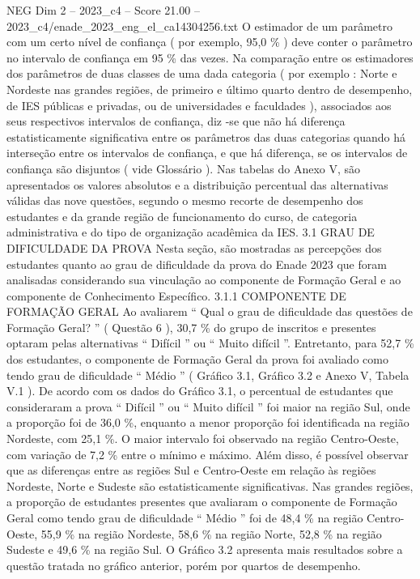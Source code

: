 \begin{textsample}{NEG Dim 2 – 2023\_c4 – Score 21.00 – 2023\_c4/enade\_2023\_eng\_el\_ca14304256.txt}
O estimador de um parâmetro com um certo nível de confiança ( por exemplo, 95,0 \% ) deve conter o parâmetro no intervalo de confiança em 95 \% das vezes.
Na comparação entre os estimadores dos parâmetros de duas classes de uma dada categoria ( por exemplo : Norte e Nordeste nas grandes regiões, de primeiro e último quarto dentro de desempenho, de IES públicas e privadas, ou de universidades e faculdades ), associados aos seus respectivos intervalos de confiança, diz -se que não há diferença estatisticamente significativa entre os parâmetros das duas categorias quando há interseção entre os intervalos de confiança, e que há diferença, se os intervalos de confiança são disjuntos ( vide Glossário ).
Nas tabelas do Anexo V, são apresentados os valores absolutos e a distribuição percentual das alternativas válidas das nove questões, segundo o mesmo recorte de desempenho dos estudantes e da grande região de funcionamento do curso, de categoria administrativa e do tipo de organização acadêmica da IES. 3.1 GRAU DE DIFICULDADE DA PROVA Nesta seção, são mostradas as percepções dos estudantes quanto ao grau de dificuldade da prova do Enade 2023 que foram analisadas considerando sua vinculação ao componente de Formação Geral e ao componente de Conhecimento Específico. 3.1.1 COMPONENTE DE FORMAÇÃO GERAL Ao avaliarem “ Qual o grau de dificuldade das questões de Formação Geral? ” ( Questão 6 ), 30,7 \% do grupo de inscritos e presentes optaram pelas alternativas “ Difícil ” ou “ Muito difícil ”.
Entretanto, para 52,7 \% dos estudantes, o componente de Formação Geral da prova foi avaliado como tendo grau de dificuldade “ Médio ” ( Gráfico 3.1, Gráfico 3.2 e Anexo V, Tabela V.1 ).
De acordo com os dados do Gráfico 3.1, o percentual de estudantes que consideraram a prova “ Difícil ” ou “ Muito difícil ” foi maior na região Sul, onde a proporção foi de 36,0 \%, enquanto a menor proporção foi identificada na região Nordeste, com 25,1 \%.
O maior intervalo foi observado na região Centro-Oeste, com variação de 7,2 \% entre o mínimo e máximo.
Além disso, é possível observar que as diferenças entre as regiões Sul e Centro-Oeste em relação às regiões Nordeste, Norte e Sudeste são estatisticamente significativas.
Nas grandes regiões, a proporção de estudantes presentes que avaliaram o componente de Formação Geral como tendo grau de dificuldade “ Médio ” foi de 48,4 \% na região Centro-Oeste, 55,9 \% na região Nordeste, 58,6 \% na região Norte, 52,8 \% na região Sudeste e 49,6 \% na região Sul.
O Gráfico 3.2 apresenta mais resultados sobre a questão tratada no gráfico anterior, porém por quartos de desempenho.

\end{textsample}
